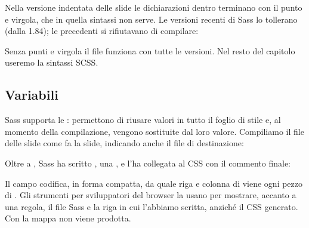 Nella versione indentata delle slide le dichiarazioni dentro 
terminano con il punto e virgola, che in quella sintassi non serve. Le versioni
recenti di Sass lo tollerano (dalla 1.84); le precedenti si rifiutavano di
compilare:

{\wtglifi
{}
}

Senza punti e virgola il file funziona con tutte le versioni. Nel resto del
capitolo useremo la sintassi SCSS.

\subsection{Variabili}

Sass supporta le : permettono di riusare valori in tutto il
foglio di stile e, al momento della compilazione, vengono sostituite dal loro
valore. Compiliamo il file delle slide come fa la slide, indicando anche il file
di destinazione:


Oltre a , Sass ha scritto , una
, e l'ha collegata al CSS con il commento finale:


Il campo  codifica, in forma compatta, da quale riga e colonna di
 viene ogni pezzo di . Gli strumenti per
sviluppatori del browser la usano per mostrare, accanto a una regola, il file
Sass e la riga in cui l'abbiamo scritta, anziché il CSS generato. Con
 la mappa non viene prodotta.

